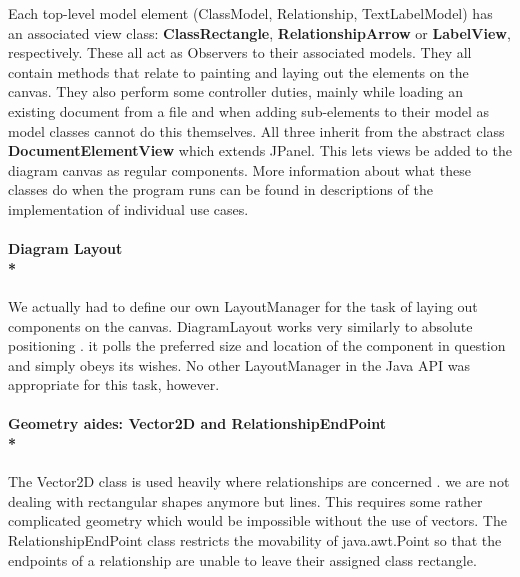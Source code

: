 \tab Each top-level model element (ClassModel, Relationship, TextLabelModel) has an associated view class: \textbf{ClassRectangle}, \textbf{RelationshipArrow} or \textbf{LabelView}, respectively. These all act as Observers to their associated models. They all contain methods that relate to painting and laying out the elements on the canvas. They also perform some controller duties, mainly while loading an existing document from a file and when adding sub-elements to their model as model classes cannot do this themselves.  All three inherit from the abstract class \textbf{DocumentElementView} which extends JPanel. This lets views be added to the diagram canvas as regular components. More information about what these classes do when the program runs can be found in descriptions of the implementation of individual use cases.

\paragraph{\small{\tab Diagram Layout\\*}}

\hspace{-10px}We actually had to define our own LayoutManager for the task of laying out components on the canvas. DiagramLayout works very similarly to absolute positioning . it polls the preferred size and location of the component in question and simply obeys its wishes.  No other LayoutManager in the Java API was appropriate for this task, however.

\paragraph{\small{\tab Geometry aides: Vector2D and RelationshipEndPoint\\*}}

\hspace{-10px}The Vector2D class is used heavily where relationships are concerned . we are not dealing with rectangular shapes anymore but lines. This requires some rather complicated geometry which would be impossible without the use of vectors. The RelationshipEndPoint class restricts the movability of java.awt.Point so that the endpoints of a relationship are unable to leave their assigned class rectangle. 
